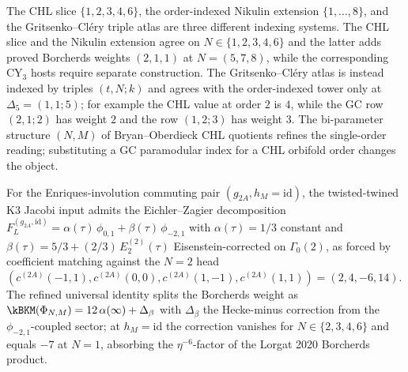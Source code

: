 \begin{remark}
\label{rem:two-scopes-different-atlases}
The CHL slice $\{1,2,3,4,6\}$, the order-indexed Nikulin extension
$\{1,\ldots,8\}$, and the Gritsenko--Cl\'ery triple atlas are three
different indexing systems. The CHL slice and the Nikulin extension
agree on $N\in\{1,2,3,4,6\}$ and the latter adds proved Borcherds weights
$(2,1,1)$ at $N=(5,7,8)$, while the corresponding CY$_3$ hosts require
separate construction. The
Gritsenko--Cl\'ery atlas is instead indexed by triples $(t,N;k)$ and
agrees with the order-indexed tower only at $\Delta_5=(1,1;5)$; for
example the CHL value at order $2$ is $4$, while the GC row
$(2,1;2)$ has weight $2$ and the row $(1,2;3)$ has weight $3$. The
bi-parameter structure $(N,M)$ of Bryan--Oberdieck CHL quotients refines
the single-order reading; substituting a GC paramodular index for a CHL
orbifold order changes the object.
\end{remark}

\begin{conjecture}[Eichler--Zagier decomposition of the twisted-twined input at \texorpdfstring{$N = 2$}{N = 2}]
\label{conj:ez-n2-2A-decomposition}
For the Enriques-involution commuting pair $(g_{2A}, h_M = \mathrm{id})$, the twisted-twined K3 Jacobi input admits the Eichler--Zagier decomposition $F_L^{(g_{2A}, \mathrm{id})} = \alpha(\tau)\,\phi_{0,1} + \beta(\tau)\,\phi_{-2,1}$ with $\alpha(\tau) = 1/3$ constant and $\beta(\tau) = 5/3 + (2/3)\,E_2^{(2)}(\tau)$ Eisenstein-corrected on $\Gamma_0(2)$, as forced by coefficient matching against the $N = 2$ head $(c^{(2A)}(-1, 1), c^{(2A)}(0, 0), c^{(2A)}(1, -1), c^{(2A)}(1, 1)) = (2, 4, -6, 14)$. The refined universal identity splits the Borcherds weight as $\kBKM(\Phi_{N, M}) = 12\,\alpha(\infty) + \Delta_\beta$ with $\Delta_\beta$ the Hecke-minus correction from the $\phi_{-2, 1}$-coupled sector; at $h_M = \mathrm{id}$ the correction vanishes for $N \in \{2, 3, 4, 6\}$ and equals $-7$ at $N = 1$, absorbing the $\eta^{-6}$-factor of the Lorgat 2020 Borcherds product.
\end{conjecture}

